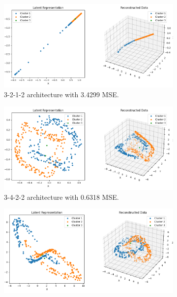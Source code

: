 \begin{figure}[htb]
  \centering
  \begin{subfigure}[b]{0.49\textwidth}
    \centering
    \includegraphics[width=\linewidth]{images/RQ1/3-2-1-2_3.4299.png}
    \caption{3-2-1-2 architecture with \textcolor{red!80!black}{3.4299} MSE.}
    \label{fig:3-2-1-2}
  \end{subfigure}
  \hfill
  \begin{subfigure}[b]{0.49\textwidth}
    \centering
    \includegraphics[width=\linewidth]{images/RQ1/3-4-2-2_0.6318.png}
    \caption{3-4-2-2 architecture with 0.6318 MSE.}
    \label{fig:3-4-2-2}
  \end{subfigure}
  \hfill
  \begin{subfigure}[b]{0.49\textwidth}
    \centering
    \includegraphics[width=\linewidth]{images/RQ1/3-8-4-2_0.2157.png}

\end{subfigure}
\end{figure}
